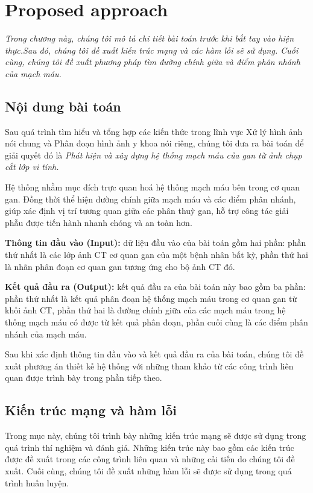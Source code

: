 \chapter{Proposed approach}
\label{chap:phuong_an_de_xuat}
	\textit{Trong chương này, chúng tôi mô tả chi tiết bài toán trước khi bắt tay vào hiện thực.\linebreak Sau đó, chúng tôi đề xuất kiến trúc mạng và các hàm lỗi sẽ sử dụng. Cuối cùng, chúng tôi đề xuất phương pháp tìm đường chính giữa và điểm phân nhánh của mạch máu.}
\minitoc

\section{Nội dung bài toán} 
\label{sec:noi_dung_bai_toan}
	Sau quá trình tìm hiểu và tổng hợp các kiến thức trong lĩnh vực Xử lý hình ảnh nói chung và Phân đoạn hình ảnh y khoa nói riêng, chúng tôi đưa ra bài toán để giải quyết đó là \textit{Phát hiện và xây dựng hệ thống mạch máu của gan từ ảnh chụp cắt lớp vi tính.}
	
	Hệ thống nhằm mục đích trực quan hoá hệ thống mạch máu bên trong cơ quan gan. Đồng thời thể hiện đường chính giữa mạch máu và các điểm phân nhánh, giúp xác định vị trí tương quan giữa các phân thuỳ gan, hỗ trợ công tác giải phẫu được tiến hành nhanh chóng và an toàn hơn.
	
	\textbf{Thông tin đầu vào (Input):} dữ liệu đầu vào của bài toán gồm hai phần: phần thứ nhất là các lớp ảnh CT cơ quan gan của một bệnh nhân bất kỳ, phần thứ hai là nhãn phân đoạn cơ quan gan tương ứng cho bộ ảnh CT đó.
	
	\textbf{Kết quả đầu ra (Output):} kết quả đầu ra của bài toán này bao gồm ba phần: phần thứ nhất là kết quả phân đoạn hệ thống mạch máu trong cơ quan gan từ khối ảnh CT, phần thứ hai là đường chính giữa của các mạch máu trong hệ thống mạch máu có được từ kết quả phân đoạn, phần cuối cùng là các điểm phân nhánh của mạch máu.
	
	Sau khi xác định thông tin đầu vào và kết quả đầu ra của bài toán, chúng tôi đề xuất phương án thiết kế hệ thống với những tham khảo từ các công trình liên quan được trình bày trong phần tiếp theo.

\section{Kiến trúc mạng và hàm lỗi} 
\label{sec:kien_truc_mang_va_ham_loi}
	Trong mục này, chúng tôi trình bày những kiến trúc mạng sẽ được sử dụng trong quá trình thí nghiệm và đánh giá. Những kiến trúc này bao gồm các kiến trúc được đề xuất trong các công trình liên quan và những cải tiến do chúng tôi đề xuất. Cuối cùng, chúng tôi đề xuất những hàm lỗi sẽ được sử dụng trong quá trình huấn luyện.
	
